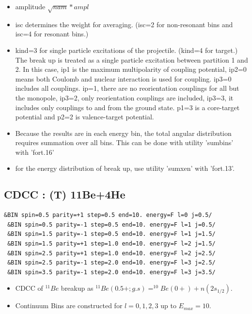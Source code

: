 \documentclass[11pt]{book}
\begin{document}
\begin{itemize}
\item amplitude $\sqrt{nam}*ampl$
\item isc determines the weight for averaging. (isc=2 for non-resonant bins
      and isc=4 for resonant bins.)
\item kind=3 for single particle excitations of the projectile. (kind=4 for target.)
      The break up is treated as a single particle excitation between  
      partition 1 and 2. In this case, ip1 is the maximum multipolarity
      of coupling potential, ip2=0 means both Coulomb and nuclear interaction
      is used for coupling. ip3=0 includes all couplings. 
      ip=1, there are no reorientation couplings for all but the monopole,
      ip3=2, only reorientation couplings are included, ip3=3, it includes only couplings to and from the ground state. 
      p1=3 is a core-target potential and p2=2 is valence-target potential.
\item Because the results are in each energy bin, the total angular distribution 
      requires summation over all bins. This can be done with utility 'sumbins'
      with 'fort.16'
\item for the energy distribution of break up, 
      use utility 'sumxen' with 'fort.13'.                         
\end{itemize}

\subsection{CDCC : (T) 11Be+4He}
\begin{small} 
\begin{lstlisting}[frame=single]
 &BIN spin=0.5 parity=+1 step=0.5 end=10. energy=F l=0 j=0.5/
 &BIN spin=0.5 parity=-1 step=0.5 end=10. energy=F l=1 j=0.5/
 &BIN spin=1.5 parity=-1 step=0.5 end=10. energy=F l=1 j=1.5/
 &BIN spin=1.5 parity=+1 step=1.0 end=10. energy=F l=2 j=1.5/
 &BIN spin=2.5 parity=+1 step=1.0 end=10. energy=F l=2 j=2.5/
 &BIN spin=2.5 parity=-1 step=2.0 end=10. energy=F l=3 j=2.5/
 &BIN spin=3.5 parity=-1 step=2.0 end=10. energy=F l=3 j=3.5/
\end{lstlisting}
\end{small} 
\begin{itemize}
\item CDCC of $^{11}Be$ breakup as
     $^{11}Be(0.5+;g.s)=^{10}Be(0+)+n(2s_{1/2})$. 
\item Continuum Bins are constructed for $l=0,1,2,3$     
      up to $E_{max}=10$. 
\end{itemize}
\end{document}
